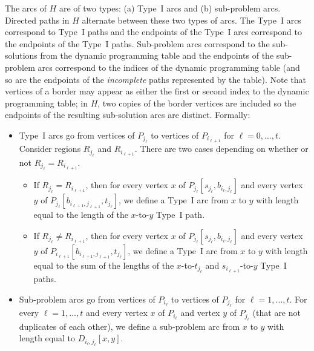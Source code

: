 \documentclass[11pt,twoside]{article}
\newcommand{\spath}[1]{P_{#1}}
\begin{document}
The arcs of $H$ are of two types: (a) Type~I arcs and (b) sub-problem arcs.  Directed paths in $H$ alternate between these two types of arcs.  The Type~I arcs correspond to Type~I paths and the endpoints of the Type~I arcs correspond to the endpoints of the Type~I paths.
Sub-problem arcs correspond to the sub-solutions from the dynamic programming table and the endpoints of the sub-problem arcs correspond to the indices of the dynamic programming table (and so are the endpoints of the {\em incomplete} paths represented by the table).  Note that vertices of a border may appear as either the first or second index to the dynamic programming table; in $H$, two copies of the border vertices are included so the endpoints of the resulting sub-solution arcs are distinct.  Formally:
\begin{itemize}
\item Type~I arcs go from vertices of $\spath{j_\ell}$ to vertices of $\spath{i_{\ell+1}}$ for $\ell = 0,\ldots,t$.  Consider regions $R_{j_\ell}$ and $R_{i_{\ell+1}}$.  There are two cases depending on whether or not $R_{j_\ell} = R_{i_{\ell+1}}$.
  \begin{itemize}
  \item If $R_{j_\ell} = R_{i_{\ell+1}}$, then for every vertex $x$ of $\spath{j_\ell}[s_{j_\ell},b_{i_\ell,j_\ell}]$ and every vertex $y$ of $\spath{j_\ell}[b_{i_{\ell+1},j_{\ell+1}},t_{j_\ell}]$, we define a Type~I arc from $x$ to $y$ with length equal to the length of the $x$-to-$y$ Type~I path.
  \item If $R_{j_\ell} \ne R_{i_{\ell+1}}$, then for every vertex $x$ of $\spath{j_\ell}[s_{j_\ell},b_{i_\ell,j_\ell}]$ and every vertex $y$ of $\spath{i_{\ell+1}}[b_{i_{\ell+1},j_{\ell+1}},t_{j_\ell}]$, we define a Type~I arc from $x$ to $y$ with length equal to the sum of the lengths of the $x$-to-$t_{j_\ell}$ and $s_{i_{\ell+1}}$-to-$y$ Type~I paths.
  \end{itemize}
\item Sub-problem arcs go from vertices of $\spath{i_\ell}$ to vertices of $\spath{j_\ell}$ for $\ell = 1, \ldots, t$. For every $\ell = 1, \ldots, t$ and every vertex $x$ of $\spath{i_\ell}$ and vertex $y$ of $\spath{j_\ell}$ (that are not duplicates of each other), we define a sub-problem arc from $x$ to $y$ with length equal to $D_{i_\ell,j_\ell}[x,y]$.
\end{itemize}
\end{document}
